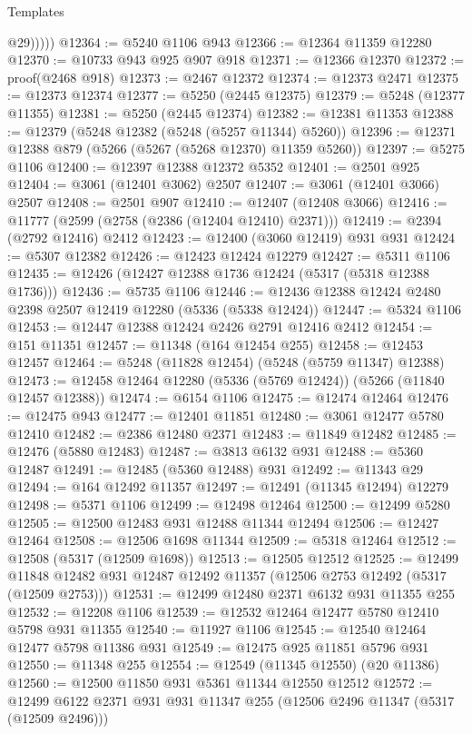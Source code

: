 \begin{lexlean}{Templates}
\begin{coremodule}
              @29)))))
@12364 := @5240 @1106 @943
@12366 := @12364 @11359 @12280
@12370 := @10733 @943 @925 @907 @918
@12371 := @12366 @12370
@12372 := proof(@2468 @918)
@12373 := @2467 @12372
@12374 := @12373 @2471
@12375 := @12373 @12374
@12377 := @5250 (@2445 @12375)
@12379 := @5248 (@12377 @11355)
@12381 := @5250 (@2445 @12374)
@12382 := @12381 @11353
@12388 := @12379 (@5248 @12382 (@5248 (@5257 @11344) @5260))
@12396 := @12371 @12388 @879 (@5266 (@5267 (@5268 @12370) @11359 @5260))
@12397 := @5275 @1106
@12400 := @12397 @12388 @12372 @5352
@12401 := @2501 @925
@12404 := @3061 (@12401 @3062) @2507
@12407 := @3061 (@12401 @3066) @2507
@12408 := @2501 @907
@12410 := @12407 (@12408 @3066)
@12416 := @11777 (@2599 (@2758 (@2386 (@12404 @12410) @2371)))
@12419 := @2394 (@2792 @12416) @2412
@12423 := @12400 (@3060 @12419) @931 @931
@12424 := @5307 @12382
@12426 := @12423 @12424 @12279
@12427 := @5311 @1106
@12435 := @12426 (@12427 @12388 @1736 @12424 (@5317 (@5318 @12388 @1736)))
@12436 := @5735 @1106
@12446 := @12436 @12388 @12424 @2480 @2398 @2507 @12419 @12280 (@5336 (@5338 @12424))
@12447 := @5324 @1106
@12453 := @12447 @12388 @12424 @2426 @2791 @12416 @2412
@12454 := @151 @11351
@12457 := @11348 (@164 @12454 @255)
@12458 := @12453 @12457
@12464 := @5248 (@11828 @12454) (@5248 (@5759 @11347) @12388)
@12473 := @12458 @12464 @12280 (@5336 (@5769 @12424)) (@5266 (@11840 @12457 @12388))
@12474 := @6154 @1106
@12475 := @12474 @12464
@12476 := @12475 @943
@12477 := @12401 @11851
@12480 := @3061 @12477 @5780 @12410
@12482 := @2386 @12480 @2371
@12483 := @11849 @12482
@12485 := @12476 (@5880 @12483)
@12487 := @3813 @6132 @931
@12488 := @5360 @12487
@12491 := @12485 (@5360 @12488) @931
@12492 := @11343 @29
@12494 := @164 @12492 @11357
@12497 := @12491 (@11345 @12494) @12279
@12498 := @5371 @1106
@12499 := @12498 @12464
@12500 := @12499 @5280
@12505 := @12500 @12483 @931 @12488 @11344 @12494
@12506 := @12427 @12464
@12508 := @12506 @1698 @11344
@12509 := @5318 @12464
@12512 := @12508 (@5317 (@12509 @1698))
@12513 := @12505 @12512
@12525 := @12499
    @11848
    @12482
    @931
    @12487
    @12492
    @11357
    (@12506 @2753 @12492 (@5317 (@12509 @2753)))
@12531 := @12499 @12480 @2371 @6132 @931 @11355 @255
@12532 := @12208 @1106
@12539 := @12532 @12464 @12477 @5780 @12410 @5798 @931 @11355
@12540 := @11927 @1106
@12545 := @12540 @12464 @12477 @5798 @11386 @931
@12549 := @12475 @925 @11851 @5796 @931
@12550 := @11348 @255
@12554 := @12549 (@11345 @12550) (@20 @11386)
@12560 := @12500 @11850 @931 @5361 @11344 @12550 @12512
@12572 := @12499 @6122 @2371 @931 @931 @11347 @255 (@12506 @2496 @11347 (@5317 (@12509 @2496)))

\end{coremodule}
\end{lexlean}

